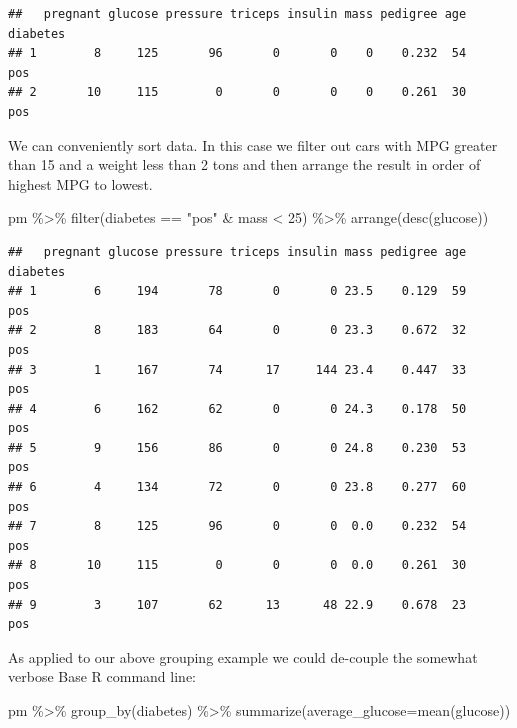 \documentclass[
]{article}
\newenvironment{Shaded}{\begin{snugshade}}{\end{snugshade}}
\newcommand{\AttributeTok}[1]{\textcolor[rgb]{0.77,0.63,0.00}{#1}}
\newcommand{\DecValTok}[1]{\textcolor[rgb]{0.00,0.00,0.81}{#1}}
\newcommand{\FunctionTok}[1]{\textcolor[rgb]{0.00,0.00,0.00}{#1}}
\newcommand{\NormalTok}[1]{#1}
\newcommand{\SpecialCharTok}[1]{\textcolor[rgb]{0.00,0.00,0.00}{#1}}
\newcommand{\StringTok}[1]{\textcolor[rgb]{0.31,0.60,0.02}{#1}}
\begin{document}
\begin{verbatim}
##   pregnant glucose pressure triceps insulin mass pedigree age diabetes
## 1        8     125       96       0       0    0    0.232  54      pos
## 2       10     115        0       0       0    0    0.261  30      pos
\end{verbatim}

We can conveniently sort data. In this case we filter out cars with MPG
greater than 15 and a weight less than 2 tons and then arrange the
result in order of highest MPG to lowest.

\begin{Shaded}
\begin{Highlighting}[]
\NormalTok{pm }\SpecialCharTok{\%\textgreater{}\%} 
  \FunctionTok{filter}\NormalTok{(diabetes }\SpecialCharTok{==} \StringTok{"pos"} \SpecialCharTok{\&}\NormalTok{ mass }\SpecialCharTok{\textless{}} \DecValTok{25}\NormalTok{) }\SpecialCharTok{\%\textgreater{}\%} 
  \FunctionTok{arrange}\NormalTok{(}\FunctionTok{desc}\NormalTok{(glucose))}
\end{Highlighting}
\end{Shaded}

\begin{verbatim}
##   pregnant glucose pressure triceps insulin mass pedigree age diabetes
## 1        6     194       78       0       0 23.5    0.129  59      pos
## 2        8     183       64       0       0 23.3    0.672  32      pos
## 3        1     167       74      17     144 23.4    0.447  33      pos
## 4        6     162       62       0       0 24.3    0.178  50      pos
## 5        9     156       86       0       0 24.8    0.230  53      pos
## 6        4     134       72       0       0 23.8    0.277  60      pos
## 7        8     125       96       0       0  0.0    0.232  54      pos
## 8       10     115        0       0       0  0.0    0.261  30      pos
## 9        3     107       62      13      48 22.9    0.678  23      pos
\end{verbatim}

As applied to our above grouping example we could de-couple the somewhat
verbose Base R command line:

\begin{Shaded}
\begin{Highlighting}[]
\NormalTok{pm }\SpecialCharTok{\%\textgreater{}\%} \FunctionTok{group\_by}\NormalTok{(diabetes) }\SpecialCharTok{\%\textgreater{}\%} \FunctionTok{summarize}\NormalTok{(}\AttributeTok{average\_glucose=}\FunctionTok{mean}\NormalTok{(glucose))}
\end{Highlighting}
\end{Shaded}
\end{document}
